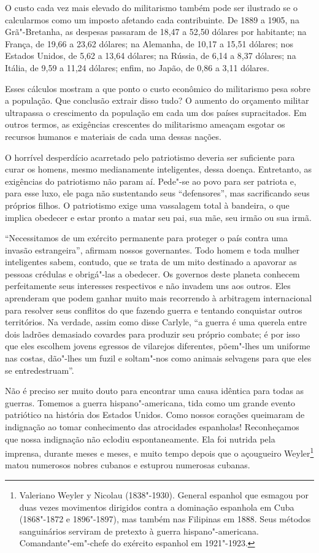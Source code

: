 O custo cada vez mais elevado do militarismo também pode ser ilustrado se
o calcularmos como um imposto afetando cada contribuinte. De 1889 a
1905, na Grã"-Bretanha, as despesas passaram de 18,47 
a 52,50 dólares por habitante; na França, de 19,66 a 23,62 dólares; na
Alemanha, de 10,17 a 15,51 dólares; nos Estados Unidos, de 5,62 a 13,64
dólares; na Rússia, de 6,14 a 8,37 dólares; na Itália, de 9,59 a 11,24
dólares; enfim, no Japão, de 0,86 a 3,11 dólares.

Esses cálculos mostram a que ponto o custo econômico do militarismo pesa
sobre a população. Que conclusão extrair disso tudo? O aumento do
orçamento militar ultrapassa o crescimento da população em cada um dos
países supracitados. Em outros termos, as exigências crescentes do
militarismo ameaçam esgotar os recursos humanos e materiais de cada uma
dessas nações.

O horrível desperdício acarretado pelo patriotismo deveria ser
suficiente para curar os homens, mesmo medianamente inteligentes, dessa
doença. Entretanto, as exigências do patriotismo não param aí.
Pede"-se ao povo para ser patriota e, para esse luxo, ele paga não
sustentando seus “defensores”, mas sacrificando seus próprios filhos. O
patriotismo exige uma vassalagem total à bandeira, o que implica
obedecer e estar pronto a matar seu pai, sua mãe, seu irmão ou sua
irmã.

“Necessitamos de um exército permanente para proteger o país contra uma
invasão estrangeira”, afirmam nossos governantes. Todo homem e toda
mulher inteligentes sabem, contudo, que se trata de um mito destinado a
apavorar as pessoas crédulas e obrigá"-las a obedecer. Os governos
deste planeta conhecem perfeitamente seus interesses respectivos e não
invadem uns aos outros. Eles aprenderam que podem ganhar muito mais
recorrendo à arbitragem internacional para resolver seus conflitos do
que fazendo guerra e tentando conquistar outros territórios. Na
verdade, assim como disse Carlyle, “a guerra é uma querela entre dois
ladrões demasiado covardes para produzir seu próprio combate; é por
isso que eles escolhem jovens egressos de vilarejos diferentes,
põem"-lhes um uniforme nas costas, dão"-lhes um fuzil e soltam"-nos
como animais selvagens para que eles se entredestruam”.

Não é preciso ser muito douto para encontrar uma causa idêntica para
todas as guerras. Tomemos a guerra hispano"-americana, tida como um
grande evento patriótico na história dos Estados Unidos. Como nossos
corações queimaram de indignação ao tomar conhecimento das atrocidades
espanholas! Reconheçamos que nossa indignação não eclodiu
espontaneamente. Ela foi nutrida pela imprensa, durante meses e meses,
e muito tempo depois que o açougueiro Weyler\footnote{
Valeriano Weyler y Nicolau (1838"-1930). General espanhol que
esmagou por duas vezes movimentos dirigidos contra a dominação
espanhola em Cuba (1868"-1872 e 1896"-1897), mas também nas Filipinas
em 1888. Seus métodos sanguinários serviram de pretexto à guerra
hispano"-americana. Comandante"-em"-chefe do exército espanhol em
1921"-1923.} matou numerosos nobres
cubanos e estuprou numerosas cubanas.

